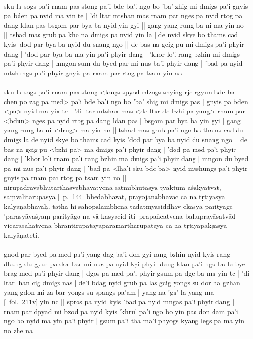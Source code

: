 \documentclass[12pt]{article}
\begin{document}
\textbf{\TVA}\\
sku la sogs pa'i rnam pas stong pa'i bde ba'i ngo bo 'ba' zhig mi dmigs pa'i gnyis pa bden pa nyid ma yin te | 'di ltar mtshan mas rnam par nges pa nyid rtog pa dang ldan pas bsgom par bya ba nyid yin gyi || gang yang rung ba ni ma yin no || tshad mas grub pa kho na dmigs pa nyid yin la | de nyid skye bo thams cad kyis 'dod par bya ba nyid du snang ngo || de bas na gcig pu mi dmigs pa'i phyir dang | 'dod par bya ba ma yin pa'i phyir dang | 'khor lo'i rang bzhin mi dmigs pa'i phyir dang | mngon sum du byed par mi nus ba'i phyir dang | 'bad pa nyid mtshungs pa'i phyir gnyis pa rnam par rtog pa tsam yin no ||\\

\textbf{\TVB}\\
sku la sogs pa'i rnam pas stong <longs spyod rdzogs snying rje rgyun bde ba chen po zag pa med> pa'i bde ba'i ngo bo 'ba' shig mi dmigs pas | gnyis pa bden <pa> nyid ma yin te | 'di ltar mtshan mas <de ltar de bzhi pa yang> rnam par <bdun> nges pa nyid rtog pa dang ldan pas | bsgom par bya ba yin gyi | gang yang rung ba ni <drug> ma yin no || tshad mas grub pa'i ngo bo thams cad du dmigs la de nyid skye bo thams cad kyis 'dod par bya ba nyid du snang ngo || de bas na gcig pu <bzhi pa> ma dmigs pa'i phyir dang | 'dod pa med pa'i phyir dang | 'khor lo'i rnam pa'i rang bzhin ma dmigs pa'i phyir dang | mngon du byed pa mi nus pa'i phyir dang | 'bad pa <lha'i sku bde ba> nyid mtshungs pa'i phyir gnyis pa rnam par rtog pa tsam yin no ||\\

nirupadravabhūtārthasvabhāvatvena sātmībhūtasya tyaktum aśakyatvāt, saṃvalitarūpasya [\EDD\ p.\ 144] bhedābhāvāt, prayojanābhāvāc ca na tṛtīyasya\footnoteB{
	tṛtīyasya] \conj ; tṛtīya \MS ; tṛtīyaḥ \EDD
} kalyāṇabhāvaḥ.\footnoteB{
	] \conj\ (Tib: dge ba [ma] yin); kalyanībhāvaḥ \MS\PCreading ; kalyānībhāvaḥ \MS\ACreading ; dge ba ma yin \emph{[na] kalyāṇabhāvaḥ}
} tathā hi sahopalambhena\footnoteB{
	sahopalambhena] \EDD ; saholaṃbhena \MS
} tādātmyasiddhāv ekasya parityāge 'parasyāvaśyaṃ parityāgo na vā kasyacid iti. prapañcatvena bahuprayāsatvād vicārāsahatvena bhrāntirūpatayāparamārtharūpatayā ca na tṛtīyapakṣasya\footnoteB{
	tṛtīyapakṣasya] \EDD ; tṛtīyāntaḥ | pakṣasya \MS ; gsum pa'i tha' ma'i phyogs \TVA ; gsum pa'i mtha' ma'i phyogs \TVB
} kalyāṇateti.\footnoteB{
	kalyāṇateti] \EDD ; kalyānateti \MS
}\\

\textbf{\TVA}\\
gnod par byed pa med pa'i yang dag ba'i don gyi rang bzhin nyid kyis rang dbang du gyur pa dor bar mi nus pa nyid kyi phyir dang ldan pa'i ngo bo la bye brag med pa'i phyir dang | dgos pa med pa'i phyir gsum pa dge ba ma yin te | 'di ltar lhan cig dmigs nas | de'i bdag nyid grub pa las gcig yongs su dor na gzhan yang gdon mi za bar yongs su spangs pa'am | yang na 'ga' la yang ma [\TVA\ fol.\ 211v] yin no || spros pa nyid kyis 'bad pa nyid mngas pa'i phyir dang | rnam par dpyad mi bzod pa nyid kyis 'khrul pa'i ngo bo yin pas don dam pa'i ngo bo nyid ma yin pa'i phyir | gsum pa'i tha ma'i phyogs kyang legs pa ma yin no zhe na |\\
\end{document}
